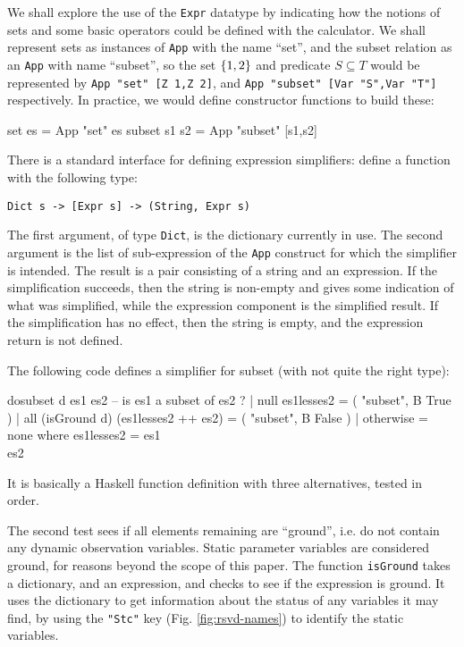 We shall explore the use of the \texttt{Expr}  datatype
by indicating how the notions of sets and some basic operators
could be defined with the calculator.
We shall represent sets as instances of \texttt{App} with the name ``set'',
and the subset relation as an \texttt{App} with name ``subset'',
so the set $\{{1,2}\}$  and predicate $S \subseteq T$
would be represented by
\verb$App "set" [Z 1,Z 2]$,
and
\verb$App "subset" [Var "S",Var "T"]$ respectively.
In practice, we would define constructor functions to build
these:
\begin{code}
set es = App "set" es
subset s1 s2 = App "subset" [s1,s2]
\end{code}
There is a standard interface for defining expression simplifiers:
define a function with the following type:
\begin{verbatim}
Dict s -> [Expr s] -> (String, Expr s)
\end{verbatim}
The first argument, of type \texttt{Dict},
is the dictionary currently in use.
The second argument is the list of sub-expression of
the \texttt{App} construct for which the simplifier is intended.
The result is a pair consisting of a string and an expression.
If the simplification succeeds, then the string is non-empty
and gives some indication
of what was simplified,
while the expression component is the simplified result.
If the simplification has no effect, then the string is empty,
and the expression return is not defined.

The following code defines a simplifier for subset
(with not quite the right type):
\begin{code}
dosubset d es1 es2 -- is es1 a subset of es2 ?
  | null es1lesses2  =  ( "subset", B True )
  | all (isGround d) (es1lesses2 ++ es2)
                     =  ( "subset", B False )
  | otherwise        =  none
  where
    es1lesses2 = es1 \\ es2
\end{code}
It is basically a Haskell function definition with three alternatives,
tested in order.

The second test sees if all elements remaining are ``ground'',
i.e. do not contain any dynamic observation variables.
Static parameter variables are considered ground,
for reasons beyond the scope of this paper.
The function \texttt{isGround} takes a dictionary,
and an expression, and checks to see if the expression is ground.
It uses the dictionary to get information about the status
of any variables it may find, by using the \verb$"Stc"$ key
(Fig. \ref{fig:rsvd-names}) to identify the static variables.

